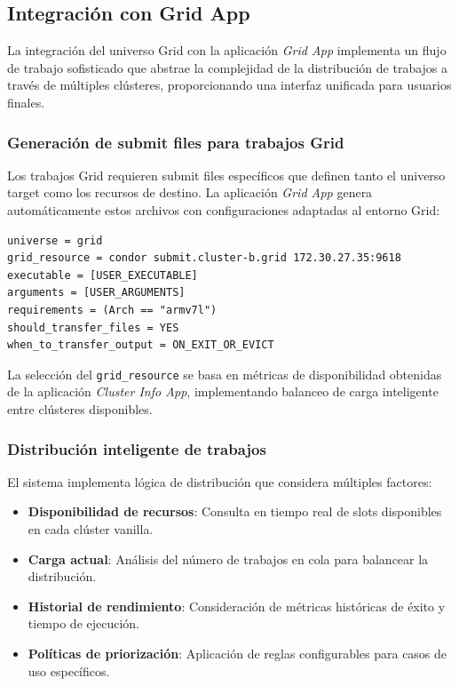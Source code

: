 \subsection{Integración con Grid App}
\noindent

La integración del universo Grid con la aplicación \textit{Grid App} implementa un flujo de trabajo sofisticado que abstrae la complejidad de la distribución de trabajos a través de múltiples clústeres, proporcionando una interfaz unificada para usuarios finales.

\subsubsection{Generación de submit files para trabajos Grid}
\noindent

Los trabajos Grid requieren submit files específicos que definen tanto el universo target como los recursos de destino. La aplicación \textit{Grid App} genera automáticamente estos archivos con configuraciones adaptadas al entorno Grid:

\begin{verbatim}
universe = grid
grid_resource = condor submit.cluster-b.grid 172.30.27.35:9618
executable = [USER_EXECUTABLE]
arguments = [USER_ARGUMENTS]
requirements = (Arch == "armv7l")
should_transfer_files = YES
when_to_transfer_output = ON_EXIT_OR_EVICT
\end{verbatim}

La selección del \texttt{grid\_resource} se basa en métricas de disponibilidad obtenidas de la aplicación \textit{Cluster Info App}, implementando balanceo de carga inteligente entre clústeres disponibles.

\subsubsection{Distribución inteligente de trabajos}
\noindent

El sistema implementa lógica de distribución que considera múltiples factores:

\begin{itemize}
	\item \textbf{Disponibilidad de recursos}: Consulta en tiempo real de slots disponibles en cada clúster vanilla.
	
	\item \textbf{Carga actual}: Análisis del número de trabajos en cola para balancear la distribución.
	
	\item \textbf{Historial de rendimiento}: Consideración de métricas históricas de éxito y tiempo de ejecución.
	
	\item \textbf{Políticas de priorización}: Aplicación de reglas configurables para casos de uso específicos.
\end{itemize}

